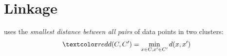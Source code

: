 \documentclass[
	number={6},
	title={Clustering}
]{cs584notes}
\begin{document}
\section{Linkage}\label{sec:linkage}
\begin{description}[font=\emph]
	\item[Single Linkage] uses the \emph{smallest distance between all pairs} of data points in two clusters:
	\[ \data{ d(C, C') = \min_{x\in C, x{'}\in C{'}} d(x, x{'}) } \]
\end{description}
\end{document}
